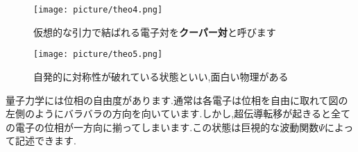 \documentclass[12pt, a3j, dvipdfmx, jis2004]{jsarticle}
\begin{document}
\begin{tcbraster}[raster columns = 2, raster equal height = rows]
\begin{tcolorbox}[title = 超伝導のメカニズム]
	\begin{figure}[H]
		\centering
		\vspace{-1zh}
		\texttt{[image: picture/theo4.png]}
		\caption{仮想的な引力で結ばれる電子対を\textbf{クーパー対}と呼びます}
	\end{figure}
	\end{tcolorbox}
	\begin{tcolorbox}[title = 巨視的波動関数(\texttt{High Level}), raster multicolumn = 2]
		\begin{wrapfigure}{l}[0pt]{0.5\linewidth}
			\centering
			\vspace{-2zh}
			\texttt{[image: picture/theo5.png]}
			\caption{自発的に対称性が破れている状態といい,面白い物理がある}
			\end{wrapfigure}
			量子力学には位相の自由度があります.通常は各電子は位相を自由に取れて図の左側のようにバラバラの方向を向いています.しかし,超伝導転移が起きると全ての電子の位相が一方向に揃ってしまいます.この状態は巨視的な波動関数$\Psi$によって記述できます.
	\end{tcolorbox}
\end{tcbraster}



\newpage
\end{document}
